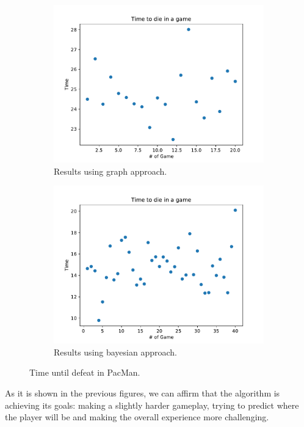\begin{figure}[H]
  \centering
  \begin{subfigure}[H]{0.4\textwidth}
    \includegraphics[scale = 0.5]{files/CodigoViejo.pdf}
    \centering
    \caption{Results using graph approach.}
  \end{subfigure}
  \hspace{1cm}
  \begin{subfigure}[H]{0.4\textwidth}
    \includegraphics[scale = 0.5]{files/CodigoNuevo.pdf}
    \centering
    \caption{Results using bayesian approach.}
  \end{subfigure}
  \caption{Time until defeat in PacMan.}
  \label{img:timeresults}
\end{figure}

As it is shown in the previous figures, we can affirm that the algorithm is achieving its goals: making a slightly harder gameplay, trying to predict where the player will be and making the overall experience more challenging.












